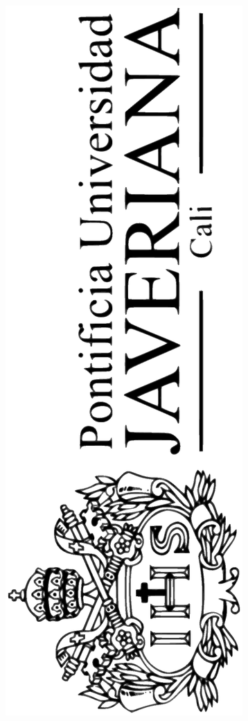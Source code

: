 
\thispagestyle{empty}
\vfill  
\includegraphics[scale=0.2,angle=270]{illustrations/logo/LogoHorizontalNegro.eps} \\
 
